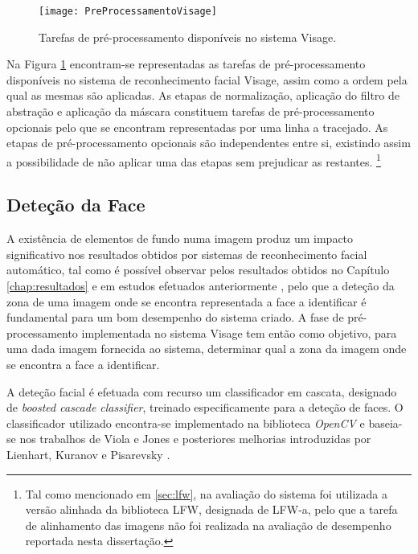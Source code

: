 \begin{figure}[t]
  \begin{center}
    \leavevmode
    \texttt{[image: PreProcessamentoVisage]}
    \caption{Tarefas de pré-processamento disponíveis no sistema Visage.}
    \label{fig:preprocessamento}
  \end{center}
\end{figure}


Na Figura \ref{fig:preprocessamento} encontram-se representadas as tarefas de pré-processamento disponíveis no sistema de reconhecimento facial Visage, assim como a ordem pela qual as mesmas são aplicadas. As etapas de normalização, aplicação do filtro de abstração e aplicação da máscara constituem tarefas de pré-processamento opcionais pelo que se encontram representadas por uma linha a tracejado. As etapas de pré-processamento opcionais são independentes entre si, existindo assim a possibilidade de não aplicar uma das etapas sem prejudicar as restantes.  \footnote{Tal como mencionado em \ref{sec:lfw}, na avaliação do sistema foi utilizada a versão alinhada da biblioteca LFW, designada de LFW-a, pelo que a tarefa de alinhamento das imagens não foi realizada na avaliação de desempenho reportada nesta dissertação.}

\subsection{Deteção da Face} \label{sec:detecao_face}
A existência de elementos de fundo numa imagem produz um impacto significativo nos resultados obtidos por sistemas de reconhecimento facial automático, tal como é possível observar pelos resultados obtidos no Capítulo \ref{chap:resultados} e em estudos efetuados anteriormente \cite{Kumar2009}, pelo que a deteção da zona de uma imagem onde se encontra representada a face a identificar é fundamental para um bom desempenho do sistema criado. A fase de pré-processamento implementada no sistema Visage tem então como objetivo, para uma dada imagem fornecida ao sistema, determinar qual a zona da imagem onde se encontra a face a identificar.

A deteção facial é efetuada com recurso um classificador em cascata, designado de \textit{boosted cascade classifier},  treinado especificamente para a deteção de faces. O classificador utilizado encontra-se implementado na biblioteca \textit{OpenCV} e baseia-se nos trabalhos de Viola e Jones \cite{Viola2001} e posteriores melhorias introduzidas por Lienhart, Kuranov e Pisarevsky \cite{Lienhart2003}.

